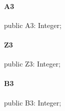 \documentclass{report}
\begin{document}
\paragraph*{A3}\hspace*{\fill}

\begin{list}{}{
\setlength{\itemindent}{0cm}
\setlength{\listparindent}{0cm}
\setlength{\leftmargin}{\evensidemargin}
\addtolength{\leftmargin}{\tmplength}
\settowidth{\labelsep}{X}
\addtolength{\leftmargin}{\labelsep}
\setlength{\labelwidth}{\tmplength}
}
\begin{flushleft}
\item[\textbf{Declaration}\hfill]
\begin{ttfamily}
public A3: Integer;\end{ttfamily}


\end{flushleft}
\end{list}
\paragraph*{Z3}\hspace*{\fill}

\begin{list}{}{
\setlength{\itemindent}{0cm}
\setlength{\listparindent}{0cm}
\setlength{\leftmargin}{\evensidemargin}
\addtolength{\leftmargin}{\tmplength}
\settowidth{\labelsep}{X}
\addtolength{\leftmargin}{\labelsep}
\setlength{\labelwidth}{\tmplength}
}
\begin{flushleft}
\item[\textbf{Declaration}\hfill]
\begin{ttfamily}
public Z3: Integer;\end{ttfamily}


\end{flushleft}
\end{list}
\paragraph*{B3}\hspace*{\fill}

\begin{list}{}{
\setlength{\itemindent}{0cm}
\setlength{\listparindent}{0cm}
\setlength{\leftmargin}{\evensidemargin}
\addtolength{\leftmargin}{\tmplength}
\settowidth{\labelsep}{X}
\addtolength{\leftmargin}{\labelsep}
\setlength{\labelwidth}{\tmplength}
}
\begin{flushleft}
\item[\textbf{Declaration}\hfill]
\begin{ttfamily}
public B3: Integer;\end{ttfamily}


\end{flushleft}
\end{list}
\end{document}
